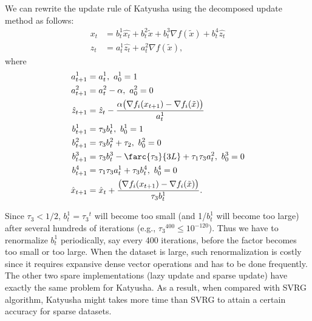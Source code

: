 \documentclass{article}
\begin{document}
We can rewrite the update rule of Katyusha using the decomposed update method as follows:
\begin{equation}
\begin{aligned}
    x_t &= b_t^1 \hat{x_t} + b_t^2 \tilde{x} + b_t^3 \nabla f(\tilde{x}) + b_t^4 \hat{z_t} \\
    z_t &= a_t^1 \hat{z_t} + a_t^2 \nabla f(\tilde{x}),
\end{aligned}
\end{equation}
where
\begin{equation}
\begin{aligned}
    a_{t+1}^1 &= a_t^1, \  a_0^1 = 1 \\
    a_{t+1}^2 &= a_t^2 - \alpha,\  a_0^2 = 0  \\
    \hat{z}_{t+1} &= \hat{z}_t - \frac{\alpha \big(\nabla f_i(x_{t+1}) - \nabla f_i(\tilde{x}) \big)}{a_t^1}  \\
    b_{t+1}^1 &= \tau_3 b_t^1,\  b_0^1 = 1 \\
    b_{t+1}^2 &= \tau_3 b_t^2 + \tau_2,\  b_0^2 = 0 \\
    b_{t+1}^3 &= \tau_3 b_t^3 - \farc{\tau_3}{3L} + \tau_1 \tau_3 a_t^2,\  b_0^3 = 0 \\
    b_{t+1}^4 &= \tau_1 \tau_3 a_t^1 + \tau_3 b_t^4,\  b_0^4 = 0\\
    \hat{x}_{t+1} &= \hat{x}_t + \frac{\big(\nabla f_i(x_{t+1}) - \nabla f_i(\tilde{x}) \big)}{\tau_3 b_t^1}.
\end{aligned}
\end{equation}

Since $\tau_3 < 1/2$, $b_t^1 = {\tau_3}^t$ will become too small (and 1/$b_t^1$ will become too large) after several hundreds of iterations (e.g., ${\tau_3}^{400} \le 10^{-120}$). Thus we have to renormalize $b_t^1$ periodically, say every 400 iterations, before the factor becomes too small or too large. When the dataset is large, such renormalization is costly since it requires expansive dense vector operations and has to be done frequently. The other two spare implementations (lazy update and sparse update) have exactly the same problem for Katyusha. As a result, when compared with SVRG algorithm, Katyusha might takes more time than SVRG to attain a certain accuracy for sparse datasets.




\end{document}
